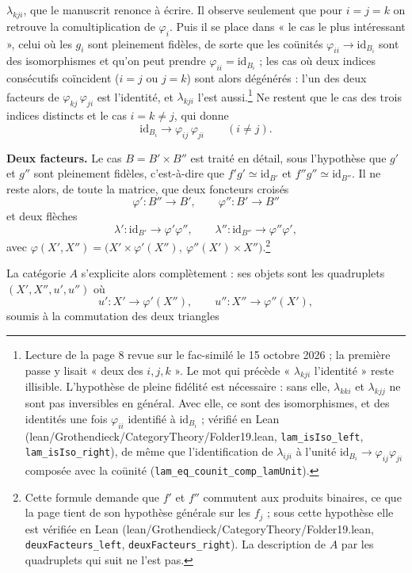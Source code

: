\documentclass[11pt,a4paper]{article}
\begin{document}
$\lambda_{kji}$, que le manuscrit renonce à écrire. Il observe seulement que
pour $i = j = k$ on retrouve la comultiplication de $\varphi_{i}$. Puis il se
place dans « le cas le plus intéressant », celui où les $g_{i}$ sont pleinement
fidèles, de sorte que les coünités $\varphi_{ii} \to \mathrm{id}_{B_{i}}$ sont
des isomorphismes et qu'on peut prendre $\varphi_{ii} = \mathrm{id}_{B_{i}}$ ;
les cas où deux indices consécutifs coïncident ($i = j$ ou $j = k$) sont alors
dégénérés : l'un des deux facteurs de $\varphi_{kj}\, \varphi_{ji}$ est
l'identité, et $\lambda_{kji}$ l'est aussi.\footnote{Lecture de la page 8
revue sur le fac-similé le 15 octobre 2026 ; la première passe y lisait « deux
des $i, j, k$ ». Le mot qui précède « $\lambda_{kji}$ l'identité » reste
illisible. L'hypothèse de pleine fidélité est nécessaire : sans elle,
$\lambda_{kki}$ et $\lambda_{kjj}$ ne sont pas inversibles en général. Avec
elle, ce sont des isomorphismes, et des identités une fois $\varphi_{ii}$
identifié à $\mathrm{id}_{B_{i}}$ ; vérifié en Lean
(lean/Grothendieck/CategoryTheory/Folder19.lean, \texttt{lam\_isIso\_left},
\texttt{lam\_isIso\_right}), de même que l'identification de $\lambda_{iji}$ à
l'unité $\mathrm{id}_{B_{i}} \to \varphi_{ij}\varphi_{ji}$ composée avec la
coünité (\texttt{lam\_eq\_counit\_comp\_lamUnit}).} Ne restent que le cas
des trois indices distincts et le cas $i = k \neq j$, qui donne
\[
  \mathrm{id}_{B_{i}} \longrightarrow \varphi_{ij}\, \varphi_{ji}
  \qquad (i \neq j) .
\]


\textbf{Deux facteurs.} Le cas $B = B' \times B''$ est traité en détail, sous
l'hypothèse que $g'$ et $g''$ sont pleinement fidèles, c'est-à-dire que
$f'g' \simeq \mathrm{id}_{B'}$ et $f''g'' \simeq \mathrm{id}_{B''}$. Il ne
reste alors, de toute la matrice, que deux foncteurs croisés
\[
  \varphi' : B'' \longrightarrow B' , \qquad
  \varphi'' : B' \longrightarrow B''
\]
et deux flèches
\[
  \lambda' : \mathrm{id}_{B'} \longrightarrow \varphi' \varphi'' , \qquad
  \lambda'' : \mathrm{id}_{B''} \longrightarrow \varphi'' \varphi' ,
\]
avec $\varphi(X', X'') = \bigl( X' \times \varphi'(X''),\ \varphi''(X') \times
X'' \bigr)$.\footnote{Cette formule demande que $f'$ et $f''$ commutent aux
produits binaires, ce que la page tient de son hypothèse générale sur les
$f_{j}$ ; sous cette hypothèse elle est vérifiée en Lean
(lean/Grothendieck/CategoryTheory/Folder19.lean, \texttt{deuxFacteurs\_left},
\texttt{deuxFacteurs\_right}). La description de $A$ par les quadruplets qui
suit ne l'est pas.}

La catégorie $A$ s'explicite alors complètement : ses objets sont les
quadruplets $(X', X'', u', u'')$ où
\[
  u' : X' \longrightarrow \varphi'(X'') , \qquad
  u'' : X'' \longrightarrow \varphi''(X') ,
\]
soumis à la commutation des deux triangles
\end{document}
